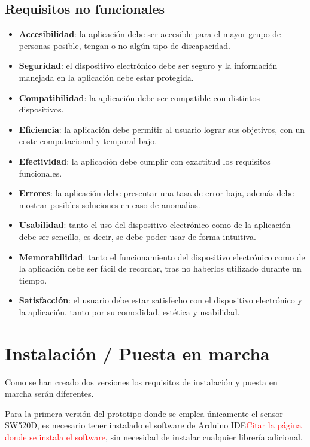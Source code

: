 \subsection{Requisitos no funcionales}
\begin{itemize}
    \item \textbf{Accesibilidad}: la aplicación debe ser accesible para el mayor grupo de personas posible, tengan o no algún tipo de discapacidad.
    \item \textbf{Seguridad}: el dispositivo electrónico debe ser seguro y la información manejada en la aplicación debe estar protegida.
    \item \textbf{Compatibilidad}: la aplicación debe ser compatible con distintos dispositivos.
    \item \textbf{Eficiencia}: la aplicación debe permitir al usuario lograr sus objetivos, con un coste computacional y temporal bajo.
    \item \textbf{Efectividad}: la aplicación debe cumplir con exactitud los requisitos funcionales. 
    \item \textbf{Errores}: la aplicación debe presentar una tasa de error baja, además debe mostrar posibles soluciones en caso de anomalías.
    \item \textbf{Usabilidad}: tanto el uso del dispositivo electrónico como de la aplicación debe ser sencillo, es decir, se debe poder usar de forma intuitiva.
    \item \textbf{Memorabilidad}: tanto el funcionamiento del dispositivo electrónico como de la aplicación debe ser fácil de recordar, tras no haberlos utilizado durante un tiempo.
    \item \textbf{Satisfacción}: el usuario debe estar satisfecho con el dispositivo electrónico y la aplicación, tanto por su comodidad, estética y usabilidad.


\end{itemize}

\clearpage
\section{Instalación / Puesta en marcha}
Como se han creado dos versiones los requisitos de instalación y puesta en marcha serán diferentes.

Para la primera versión del prototipo donde se emplea únicamente el sensor SW520D, es necesario tener instalado el software de Arduino IDE\textcolor{red}{Citar la página donde se instala el software}, sin necesidad de instalar cualquier librería adicional.

